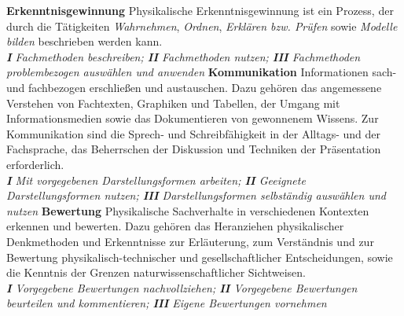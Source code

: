 \mip
{\textbf{Erkenntnisgewinnung}} \tabto{12em} \hangindent=2.7cm Physikalische Erkenntnisgewinnung ist ein Prozess, der durch die T\"{a}tigkeiten \emph{Wahrnehmen}, \emph{Ordnen}, \emph{Erkl{\"a}ren bzw. Pr{\"u}fen} sowie \emph{Modelle bilden} beschrieben werden kann. \\ \emph{\textbf{I} Fachmethoden beschreiben; \textbf{II} Fachmethoden nutzen; \textbf{III} Fachmethoden problembezogen ausw{\"a}hlen und anwenden}
\mip
{\textbf{Kommunikation}} \tabto{9em} \hangindent=2.7cm Informationen sach- und fachbezogen erschlie{\ss}en und austauschen. Dazu geh{\"o}ren das angemessene Verstehen von Fachtexten, Graphiken und Tabellen, der Umgang mit Informationsmedien sowie das Dokumentieren von gewonnenem Wissens. Zur Kommunikation sind die Sprech- und Schreibf{\"a}higkeit in der Alltags- und der Fachsprache, das Beherrschen der Diskussion und Techniken der Pr{\"a}sentation erforderlich. \\ \emph{\textbf{I} Mit vorgegebenen Darstellungsformen arbeiten; \textbf{II} Geeignete Darstellungsformen nutzen; \textbf{III} Darstellungsformen selbst{\"a}ndig ausw{\"a}hlen und nutzen}
\mip
{\textbf{Bewertung}} \tabto{7em} \hangindent=2.7cm Physikalische Sachverhalte in verschiedenen Kontexten erkennen und bewerten. Dazu geh{\"o}ren das Heranziehen physikalischer Denkmethoden und Erkenntnisse zur Erl{\"a}uterung, zum Verst{\"a}ndnis und zur Bewertung physikalisch-technischer und gesellschaftlicher Entscheidungen, sowie die Kenntnis der Grenzen naturwissenschaftlicher Sichtweisen. \\ \emph{\textbf{I}  Vorgegebene Bewertungen nachvollziehen; \textbf{II} Vorgegebene Bewertungen beurteilen und kommentieren; \textbf{III} Eigene Bewertungen vornehmen}



